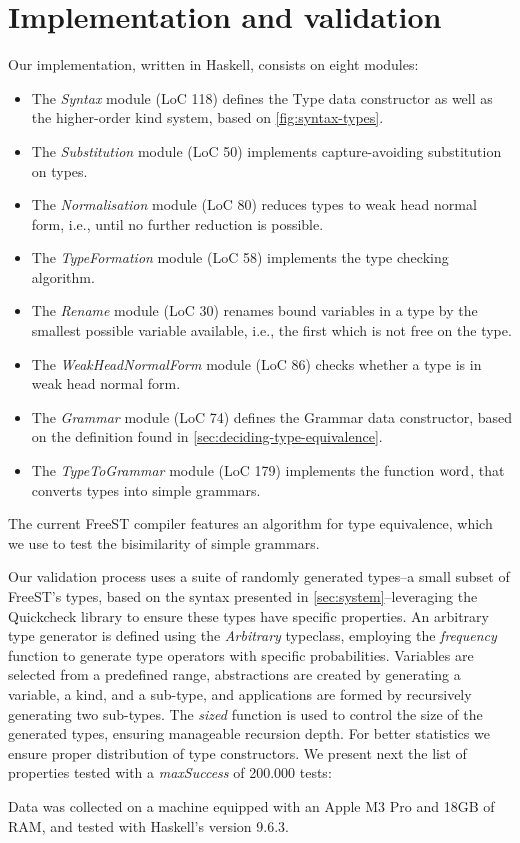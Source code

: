 \section{Implementation and validation}\label{sec:implementation}
Our implementation, written in Haskell, consists on eight modules:
\begin{itemize}
    \item The \emph{Syntax} module (LoC 118) defines the Type data constructor as well as the higher-order kind system, based on \cref*{fig:syntax-types}. 
    \item The \emph{Substitution} module (LoC 50) implements capture-avoiding substitution on types.
    \item The \emph{Normalisation} module (LoC 80) reduces types to weak head normal form, i.e., until no further reduction is possible.
    \item The \emph{TypeFormation} module (LoC 58) implements the type checking algorithm.
    \item The \emph{Rename} module (LoC 30) renames bound variables in a type by the smallest possible variable available, i.e., the first which is not free on the type.
    \item The \emph{WeakHeadNormalForm} module (LoC 86) checks whether a type is in weak head normal form. 
    \item The \emph{Grammar} module (LoC 74) defines the Grammar data constructor, based on the definition found in \cref*{sec:deciding-type-equivalence}.
    \item The \emph{TypeToGrammar} module (LoC 179) implements the function $\operatorname{word}$, that converts types into simple grammars.
\end{itemize}

The current FreeST compiler features an algorithm for type equivalence, which we use to test the bisimilarity of simple grammars.

Our validation process uses a suite of randomly generated types--a small subset of FreeST's types, based on the syntax presented in \cref*{sec:system}--leveraging the Quickcheck library\cite{DBLP:conf/icfp/ClaessenH00} to ensure these types have specific properties. An arbitrary type generator is defined using the \textit{Arbitrary} typeclass, employing the \textit{frequency} function to generate type operators with specific probabilities. Variables are selected from a predefined range, abstractions are created by generating a variable, a kind, and a sub-type, and applications are formed by recursively generating two sub-types. The \textit{sized} function is used to control the size of the generated types, ensuring manageable recursion depth. For better statistics we ensure proper distribution of type constructors. We present next the list of properties tested with a \textit{maxSuccess} of 200.000 tests:

Data was collected on a machine equipped with an Apple M3 Pro and 18GB of RAM, and tested with Haskell's version 9.6.3.

